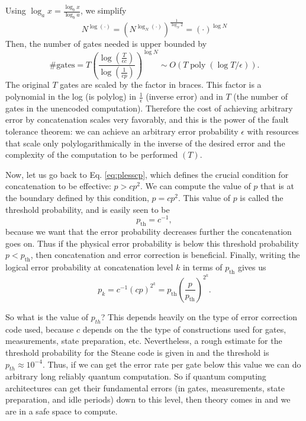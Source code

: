 Using $\log _{a} x=\frac{\log _{b} x}{\log _{b} a}$, we simplify
$$
N^{\log (\cdot)}=\left(N^{\log _{N}(\cdot)}\right)^{\frac{1}{\log _{N} 2}}=(\cdot)^{\log N}
$$
Then, the number of gates needed is upper bounded by
$$
\# \text{gates} = T\left(\frac{\log \left(\frac{T}{\epsilon c}\right)}{\log \left(\frac{1}{c p}\right)}\right)^{\log N} \sim  O(T\operatorname{poly}(\log T / \epsilon)).
$$
The original $T$ gates are scaled by the factor in braces. This factor is a polynomial in the log (is polylog) in $\frac{1}{\epsilon}$ (inverse error) and in $T$ (the number of gates in the unencoded computation). Therefore the cost of achieving arbitrary error by concatenation scales very favorably, and this is the power of the fault tolerance theorem: we can achieve an arbitrary error probability $\epsilon$ with resources that scale only polylogarithmically in the inverse of the desired error and the complexity of the computation to be performed $(T)$.

Now, let us go back to Eq. \ref{eq:plesscp}, which defines the crucial condition for concatenation to be effective: $p>c p^{2}$. We can compute the value of $p$ that is at the boundary defined by this condition, $p=c p^{2}$. This value of $p$ is called the threshold probability, and is easily seen to be
$$
p_{\mathrm{th}}=c^{-1},
$$
because we want that the error probability decreases further the concatenation goes on.
Thus if the physical error probability is below this threshold probability $p<p_{\mathrm{th}}$, then concatenation and error correction is beneficial. Finally, writing the logical error probability at concatenation level $k$ in terms of $p_{\mathrm{th}}$ gives us
$$
p_{k}=c^{-1}(c p)^{2^{k}}=p_{\mathrm{th}}\left(\frac{p}{p_{\mathrm{th}}}\right)^{2^{k}}.
$$



So what is the value of $p_{th}$? This depends heavily on the type of error correction code used, because $c$ depends on the the type of constructions used for gates, measurements, state preparation, etc. Nevertheless, a rough estimate for the threshold probability for the Steane code is given in \cite{Chuang} and the threshold is $p_{th} \approx 10^{-4}$. Thus, if we can get the error rate per gate below this value we can do arbitrary long reliably quantum computation. So if quantum computing architectures can get their fundamental errors (in gates, measurements, state preparation, and idle periods) down to this level, then theory comes in and we are in a safe space to compute.

